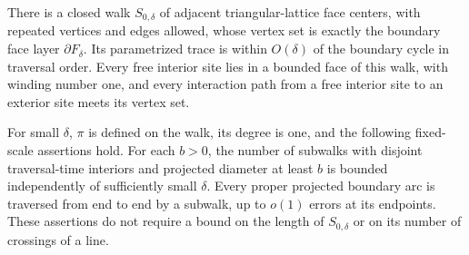 \begin{lemma}\label{lem:boundary-walk}
There is a closed walk $S_{0,\delta}$ of adjacent triangular-lattice face
centers, with repeated vertices and edges allowed, whose vertex set is
exactly the boundary face layer $\partial F_\delta$.  Its parametrized
trace is within $O(\delta)$ of the boundary cycle in traversal order.
Every free interior site lies in a bounded face of this walk, with
winding number one, and every interaction path from a free interior site
to an exterior site meets its vertex set.

For small $\delta$, $\pi$ is defined on the walk, its degree is one,
and the following fixed-scale assertions hold.  For each $b>0$, the
number of subwalks with disjoint traversal-time interiors and projected
diameter at least $b$ is bounded independently of sufficiently small
$\delta$.  Every proper projected boundary arc is traversed from end
to end by a subwalk, up to $o(1)$ errors at its endpoints.  These
assertions do not require a bound on the length of $S_{0,\delta}$ or
on its number of crossings of a line.
\end{lemma}

